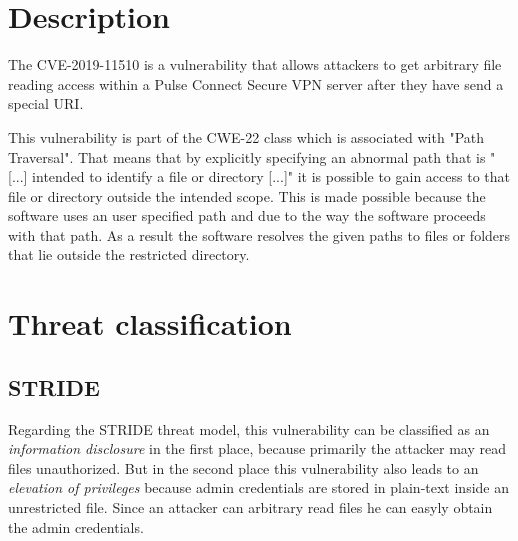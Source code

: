 

\section{Description}
\label{description}
The CVE-2019-11510 is a vulnerability that allows attackers to get arbitrary file reading access within a Pulse Connect Secure VPN server after they have send a special URI. \autocite{NVDCVE:online}

This vulnerability is part of the CWE-22 class which is associated with "Path Traversal". That means that by explicitly specifying an abnormal path that is "[...] intended to identify a file or directory [...]" \autocite{CWE22-Definition:online} it is possible to gain access to that file or directory outside the intended scope. This is made possible because the software uses an user specified path and due to the way the software proceeds with that path. As a result the software resolves the given paths to files or folders that lie outside the restricted directory. \autocite{CWE22-Definition:online}

\section{Threat classification}
\label{analysis}
\subsection{STRIDE}
\label{STRIDE}
Regarding the STRIDE threat model, this vulnerability can be classified as an \textit{information disclosure} in the first place, because primarily the attacker may read files unauthorized. But in the second place this vulnerability also leads to an \textit{elevation of privileges} \autocite{Schneider-Folie-2} because admin credentials are stored in plain-text inside an unrestricted file. Since an attacker can arbitrary read files he can easyly obtain the admin credentials. \autocite{Tenable2:online}

